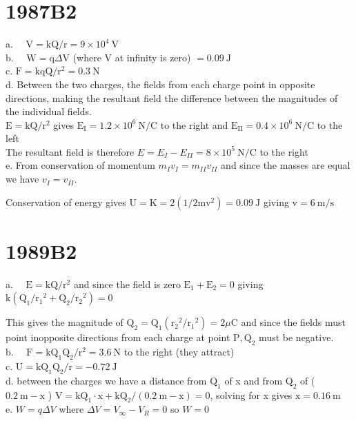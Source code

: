 \begin{enumerate}
\section*{1987B2}
a. $\quad \mathrm{V}=\mathrm{kQ} / \mathrm{r}=9 \times 10^{4} \mathrm{~V}$\\
b. $\quad \mathrm{W}=\mathrm{q} \Delta \mathrm{V}$ (where V at infinity is zero) $=0.09 \mathrm{~J}$\\
c. $\mathrm{F}=\mathrm{kqQ} / \mathrm{r}^{2}=0.3 \mathrm{~N}$\\
d. Between the two charges, the fields from each charge point in opposite directions, making the resultant field the difference between the magnitudes of the individual fields.\\
$\mathrm{E}=\mathrm{kQ} / \mathrm{r}^{2}$ gives $\mathrm{E}_{\mathrm{I}}=1.2 \times 10^{6} \mathrm{~N} / \mathrm{C}$ to the right and $\mathrm{E}_{\mathrm{II}}=0.4 \times 10^{6} \mathrm{~N} / \mathrm{C}$ to the left\\
The resultant field is therefore $E=E_{I}-E_{I I}=8 \times 10^{5} \mathrm{~N} / \mathrm{C}$ to the right\\
e. From conservation of momentum $m_{I} v_{I}=m_{I I} v_{I I}$ and since the masses are equal we have $v_{I}=v_{I I}$.

Conservation of energy gives $\mathrm{U}=\mathrm{K}=2\left(1 / 2 \mathrm{mv}^{2}\right)=0.09 \mathrm{~J}$ giving $\mathrm{v}=6 \mathrm{~m} / \mathrm{s}$

\section*{1989B2}
a. $\quad \mathrm{E}=\mathrm{kQ} / \mathrm{r}^{2}$ and since the field is zero $\mathrm{E}_{1}+\mathrm{E}_{2}=0$ giving $\mathrm{k}\left(\mathrm{Q}_{1} / \mathrm{r}_{1}{ }^{2}+\mathrm{Q}_{2} / \mathrm{r}_{2}{ }^{2}\right)=0$

This gives the magnitude of $\mathrm{Q}_{2}=\mathrm{Q}_{1}\left(\mathrm{r}_{2}{ }^{2} / \mathrm{r}_{1}{ }^{2}\right)=2 \mu \mathrm{C}$ and since the fields must point inopposite directions from each charge at point $\mathrm{P}, \mathrm{Q}_{2}$ must be negative.\\
b. $\quad \mathrm{F}=\mathrm{kQ}_{1} \mathrm{Q}_{2} / \mathrm{r}^{2}=3.6 \mathrm{~N}$ to the right (they attract)\\
c. $\mathrm{U}=\mathrm{kQ}_{1} \mathrm{Q}_{2} / \mathrm{r}=-0.72 \mathrm{~J}$\\
d. between the charges we have a distance from $\mathrm{Q}_{1}$ of x and from $\mathrm{Q}_{2}$ of ( $0.2 \mathrm{~m}-\mathrm{x}$ ) $\mathrm{V}=\mathrm{kQ}_{1} \cdot \mathrm{x}+\mathrm{kQ}_{2} /(0.2 \mathrm{~m}-\mathrm{x})=0$, solving for x gives $\mathrm{x}=0.16 \mathrm{~m}$\\
e. $W=q \Delta V$ where $\Delta V=V_{\infty}-V_{R}=0$ so $W=0$


\end{enumerate}
